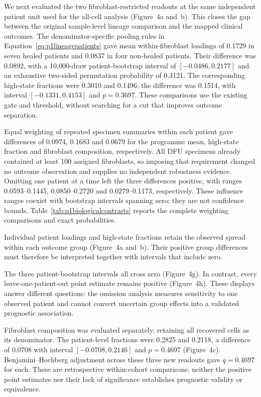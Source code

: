 \documentclass[10pt,a4paper]{article}
\begin{document}
We next evaluated the two fibroblast-restricted readouts at the same independent patient unit used for the all-cell analysis (Figure~4a and~b). This closes the gap between the original sample-level lineage comparison and the mapped clinical outcomes. The denominator-specific pooling rules in Equation~\eqref{eq:p1lineagepatients} gave mean within-fibroblast loadings of 0.1729 in seven healed patients and 0.0837 in four non-healed patients. Their difference was 0.0892, with a 10,000-draw patient-bootstrap interval of $[-0.0486,0.2177]$ and an exhaustive two-sided permutation probability of 0.3121. The corresponding high-state fractions were 0.3010 and 0.1496; the difference was 0.1514, with interval $[-0.1331,0.4153]$ and $p=0.3697$. These comparisons use the existing gate and threshold, without searching for a cut that improves outcome separation.

Equal weighting of repeated specimen summaries within each patient gave differences of 0.0974, 0.1683 and 0.0679 for the programme mean, high-state fraction and fibroblast composition, respectively. All DFU specimens already contained at least 100 assigned fibroblasts, so imposing that requirement changed no outcome observation and supplies no independent robustness evidence. Omitting one patient at a time left the three differences positive, with ranges 0.0593--0.1445, 0.0850--0.2720 and 0.0279--0.1173, respectively. These influence ranges coexist with bootstrap intervals spanning zero; they are not confidence bounds. Table~\ref{tab:p1biologicalcontrasts} reports the complete weighting comparisons and exact probabilities.

Individual patient loadings and high-state fractions retain the observed spread within each outcome group (Figure~4a and~b). Their positive group differences must therefore be interpreted together with intervals that include zero.

The three patient-bootstrap intervals all cross zero (Figure~4g). In contrast, every leave-one-patient-out point estimate remains positive (Figure~4h). These displays answer different questions: the omission analysis measures sensitivity to one observed patient and cannot convert uncertain group effects into a validated prognostic association.

Fibroblast composition was evaluated separately, retaining all recovered cells as its denominator. The patient-level fractions were 0.2825 and 0.2118, a difference of 0.0708 with interval $[-0.0708,0.2146]$ and $p=0.4697$ (Figure~4c). Benjamini--Hochberg adjustment across these three new readouts gave $q=0.4697$ for each. These are retrospective within-cohort comparisons; neither the positive point estimates nor their lack of significance establishes prognostic validity or equivalence.
\end{document}
